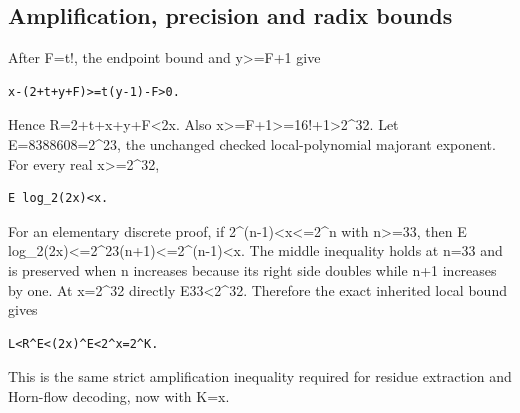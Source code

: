 \subsection{Amplification, precision and radix bounds}



After F=\allowbreak{}t!, the endpoint bound and y\textgreater{}\allowbreak{}=\allowbreak{}F+\allowbreak{}1 give



\begin{verbatim}
x-(2+t+y+F)>=t(y-1)-F>0.
\end{verbatim}

Hence R=\allowbreak{}2+\allowbreak{}t+\allowbreak{}x+\allowbreak{}y+\allowbreak{}F\textless{}\allowbreak{}2x. Also x\textgreater{}\allowbreak{}=\allowbreak{}F+\allowbreak{}1\textgreater{}\allowbreak{}=\allowbreak{}16!+\allowbreak{}1\textgreater{}\allowbreak{}2\textasciicircum{}\allowbreak{}32. Let E=\allowbreak{}8388608=\allowbreak{}2\textasciicircum{}\allowbreak{}23, the unchanged checked local-polynomial majorant exponent. For every real x\textgreater{}\allowbreak{}=\allowbreak{}2\textasciicircum{}\allowbreak{}32,



\begin{verbatim}
E log_2(2x)<x.
\end{verbatim}

For an elementary discrete proof, if 2\textasciicircum{}\allowbreak{}(n-1)\textless{}\allowbreak{}x\textless{}\allowbreak{}=\allowbreak{}2\textasciicircum{}\allowbreak{}n with n\textgreater{}\allowbreak{}=\allowbreak{}33, then E log\_\allowbreak{}2(2x)\textless{}\allowbreak{}=\allowbreak{}2\textasciicircum{}\allowbreak{}23(n+\allowbreak{}1)\textless{}\allowbreak{}=\allowbreak{}2\textasciicircum{}\allowbreak{}(n-1)\textless{}\allowbreak{}x. The middle inequality holds at n=\allowbreak{}33 and is preserved when n increases because its right side doubles while n+\allowbreak{}1 increases by one. At x=\allowbreak{}2\textasciicircum{}\allowbreak{}32 directly E\textasteriskcentered{}\allowbreak{}33\textless{}\allowbreak{}2\textasciicircum{}\allowbreak{}32. Therefore the exact inherited local bound gives



\begin{verbatim}
L<R^E<(2x)^E<2^x=2^K.
\end{verbatim}

This is the same strict amplification inequality required for residue extraction and Horn-flow decoding, now with K=\allowbreak{}x.



